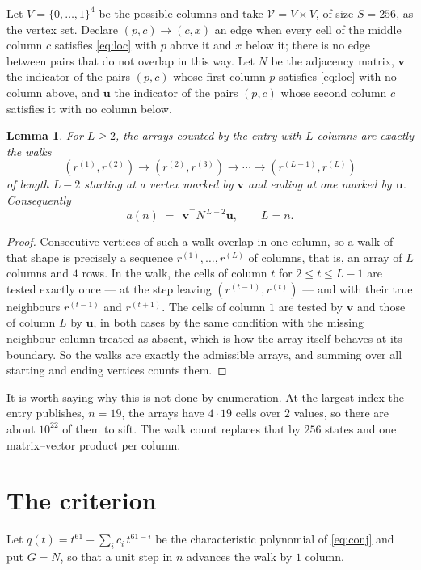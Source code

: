 \documentclass[11pt,a4paper]{article}
\theoremstyle{plain}
\newtheorem{lemma}[theorem]{Lemma}
\theoremstyle{definition}
\begin{document}
Let $V=\{0,\dots,1\}^{4}$ be the possible columns and take
$\mathcal V=V\times V$, of size $S=256$, as the vertex set. Declare $(p,c)\to(c,x)$ an edge
when every cell of the middle column $c$ satisfies \eqref{eq:loc} with $p$ above it and $x$
below it; there is no edge between pairs that do not overlap in this way. Let $N$ be the
adjacency matrix, $\mathbf{v}$ the indicator of the pairs $(p,c)$ whose first column $p$
satisfies \eqref{eq:loc} with no column above, and $\mathbf{u}$ the indicator of
the pairs $(p,c)$ whose second column $c$ satisfies it with no column below.

\begin{lemma}\label{lem:walk}
For $L\ge2$, the arrays counted by the entry with $L$ columns are exactly the walks
\[
(r^{(1)},r^{(2)})\to(r^{(2)},r^{(3)})\to\cdots\to(r^{(L-1)},r^{(L)})
\]
of length $L-2$ starting at a vertex marked by $\mathbf{v}$ and ending at one marked by
$\mathbf{u}$. Consequently
\[
a(n)\;=\;\,\mathbf{v}^{\!\top}N^{\,L-2}\mathbf{u},\qquad L=n .
\]
\end{lemma}

\begin{proof}
Consecutive vertices of such a walk overlap in one column, so a walk of that shape is
precisely a sequence $r^{(1)},\dots,r^{(L)}$ of columns, that is, an array of $L$ columns
and $4$ rows. In the walk, the cells of column $t$ for $2\le t\le L-1$ are tested
exactly once --- at the step leaving $(r^{(t-1)},r^{(t)})$ --- and with their true
neighbours $r^{(t-1)}$ and $r^{(t+1)}$. The cells of column $1$ are tested by
$\mathbf{v}$ and those of column $L$ by $\mathbf{u}$, in both cases by the same condition
with the missing neighbour column treated as absent, which is how the array itself behaves at
its boundary. So the walks are exactly the admissible arrays, and summing over all starting
and ending vertices counts them.
\end{proof}


It is worth saying why this is not done by enumeration. At the largest index the entry
publishes, $n=19$, the arrays have $4\cdot19$ cells over
$2$ values, so there are about $10^{22}$ of them to sift. The
walk count replaces that by $256$ states and one matrix--vector product per column.
\section{The criterion}

Let $q(t)=t^{61}-\sum_i c_i\,t^{61-i}$ be the characteristic polynomial of
\eqref{eq:conj} and put $G=N$, so that a unit step in $n$ advances the walk by
$1$ column.
\end{document}
